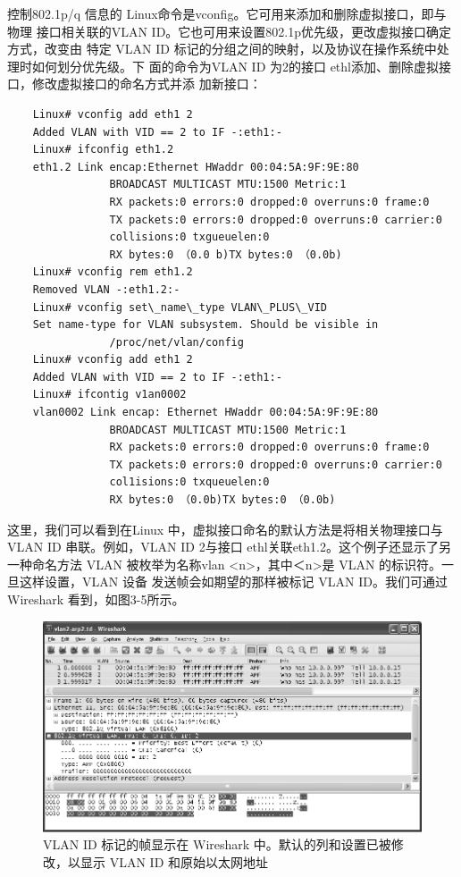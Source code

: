 控制802.1p/q 信息的 Linux命令是vconfig。它可用来添加和删除虚拟接口，即与物理
接口相关联的VLAN ID。它也可用来设置802.1p优先级，更改虚拟接口确定方式，改变由
特定 VLAN ID 标记的分组之间的映射，以及协议在操作系统中处理时如何划分优先级。下
面的命令为VLAN ID 为2的接口 ethl添加、删除虚拟接口，修改虚拟接口的命名方式并添
加新接口：
\begin{verbatim}
    Linux# vconfig add eth1 2
    Added VLAN with VID == 2 to IF -:eth1:-
    Linux# ifconfig eth1.2
    eth1.2 Link encap:Ethernet HWaddr 00:04:5A:9F:9E:80
                BROADCAST MULTICAST MTU:1500 Metric:1
                RX packets:0 errors:0 dropped:0 overruns:0 frame:0
                TX packets:0 errors:0 dropped:0 overruns:0 carrier:0
                collisions:0 txgueuelen:0
                RX bytes:0 （0.0 b)TX bytes:0 （0.0b)
    Linux# vconfig rem eth1.2
    Removed VLAN -:eth1.2:-
    Linux# vconfig set\_name\_type VLAN\_PLUS\_VID
    Set name-type for VLAN subsystem. Should be visible in
                /proc/net/vlan/config
    Linux# vconfig add eth1 2
    Added VLAN with VID == 2 to IF -:eth1:-
    Linux# ifcontig v1an0002
    vlan0002 Link encap: Ethernet HWaddr 00:04:5A:9F:9E:80
                BROADCAST MULTICAST MTU:1500 Metric:1
                RX packets:0 errors:0 dropped:0 overruns:0 frame:0
                TX packets:0 errors:0 dropped:0 overruns:0 carrier:0
                col1isions:0 txqueuelen:0
                RX bytes:0 （0.0b)TX bytes:0 （0.0b)
\end{verbatim}

这里，我们可以看到在Linux 中，虚拟接口命名的默认方法是将相关物理接口与 VLAN
ID 串联。例如，VLAN ID 2与接口 ethl关联eth1.2。这个例子还显示了另一种命名方法
VLAN 被枚举为名称vlan <n>，其中＜n>是 VLAN 的标识符。一旦这样设置，VLAN 设备
发送帧会如期望的那样被标记 VLAN ID。我们可通过 Wireshark 看到，如图3-5所示。

\begin{figure}
    \centering
    \includegraphics[scale=0.5]{imgs/3/3-5.png}
    \caption{VLAN ID 标记的帧显示在 Wireshark 中。默认的列和设置已被修改，以显示 VLAN ID 和原始以太网地址}
\end{figure}

